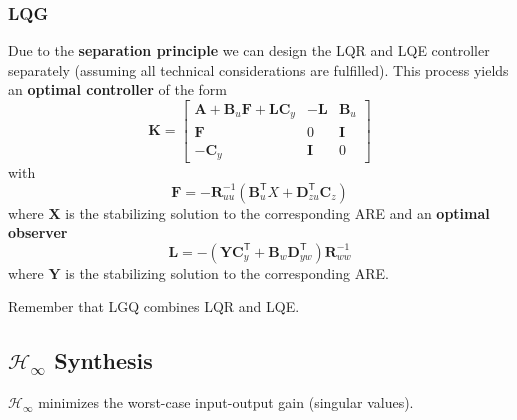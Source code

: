 \subsubsection{LQG}
Due to the \textbf{separation principle} we can design the LQR and LQE controller separately (assuming all technical considerations are fulfilled). This process yields an \textbf{optimal controller} of the form
\begin{equation*}
    \mathbf{K}=\left[\begin{array}{c|cc}%
            \mathbf{A}+\mathbf{B}_u \mathbf{F}+\mathbf{L}\mathbf{C}_y & -\mathbf{L} & \mathbf{B}_u \\
            \hline  %
            \mathbf{F}                                                & 0           & \mathbf{I}   \\
            -\mathbf{C}_y                                             & \mathbf{I}  & 0
        \end{array}\right]
\end{equation*}
with
\begin{equation*}
    \mathbf{F}=-\mathbf{R}_{uu}^{-1}(\mathbf{B}_{u}^{\mathsf{T}}X+\mathbf{D}_{zu}^{\mathsf{T}}\mathbf{C}_{z})
\end{equation*}
where $\mathbf{X}$ is the stabilizing solution to the corresponding ARE and an \textbf{optimal observer}
\begin{equation*}
    \mathbf{L}=-(\mathbf{Y}\mathbf{C}_y^{\mathsf{T}}+\mathbf{B}_w \mathbf{D}_{yw}^{\mathsf{T}})\mathbf{R}_{ww}^{-1}
\end{equation*}
where $\mathbf{Y}$ is the stabilizing solution to the corresponding ARE.


\newpar{}

Remember that LGQ combines LQR and LQE.

\subsection{\texorpdfstring{$\mathcal{H}_\infty$}{H-infinity} Synthesis}
$\mathcal{H}_\infty$ minimizes the worst-case input-output gain (singular values).

